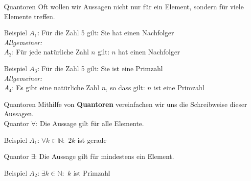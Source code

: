 %
%
%
%

\begin{frame}[fragile]{Quantoren}
    Oft wollen wir Aussagen nicht nur für ein Element, sondern für viele Elemente treffen.
    \begin{exampleblock}{Beispiel}
        $A_1$: Für die Zahl 5 gilt: Sie hat einen Nachfolger\\
        \emph{Allgemeiner:}\\
        $A_2$: Für jede natürliche Zahl $n$ gilt: $n$ hat einen Nachfolger
    \end{exampleblock}
    \begin{exampleblock}{Beispiel}
        $A_3$: Für die Zahl 5 gilt: Sie ist eine Primzahl\\
        \emph{Allgemeiner:}\\
        $A_4$: Es gibt eine natürliche Zahl $n$, so dass gilt: $n$ ist eine Primzahl
    \end{exampleblock}
\end{frame}

\begin{frame}[fragile]{Quantoren}
    Mithilfe von \textbf{Quantoren} vereinfachen wir uns die Schreibweise dieser Aussagen.\\
    \vspace{0.5cm}
    Quantor \alert{$\forall$}: Die Aussage gilt für alle Elemente.\\
    \begin{exampleblock}{Beispiel}
        $A_1$: $\forall k \in \mathbb{N}:$ $2k$ ist gerade
    \end{exampleblock}
    Quantor \alert{$\exists$}: Die Aussage gilt für mindestens ein Element.\\
    \begin{exampleblock}{Beispiel}
        $A_2$: $\exists k \in \mathbb{N}:$ $k$ ist Primzahl
    \end{exampleblock}
\end{frame}

